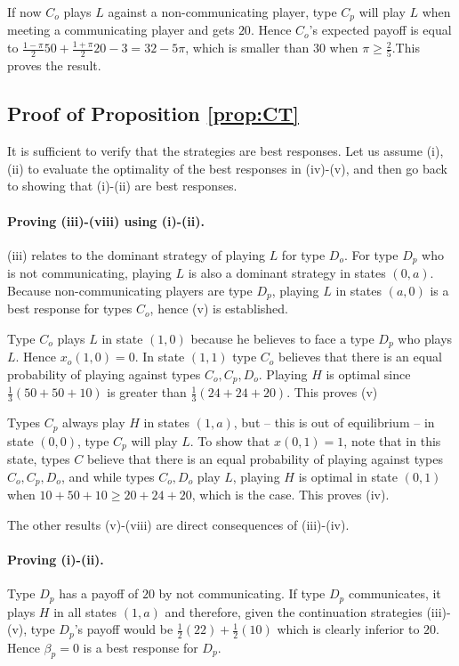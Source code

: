 \documentclass[12pt]{article}
\theoremstyle{break}
\begin{document}
	If now $C_o$ plays $L$ against a non-communicating player, type $C_p$ will play $L$ when meeting a communicating player and gets $20$.  Hence $C_o$'s expected payoff is equal to $\frac{1-\pi}{2}50+\frac{1+\pi}{2}20-3=32-5\pi$, which is smaller than $30$ when $\pi\geq \frac{2}{5}$.This proves the result.


\subsection*{Proof of Proposition \ref{prop:CT}}

It is sufficient to verify that the strategies are best responses. Let us assume (i), (ii) to evaluate the optimality of the best responses in (iv)-(v), and then go back to showing that (i)-(ii) are best responses.

\paragraph{Proving (iii)-(viii) using (i)-(ii).} (iii) relates to the dominant strategy of playing $L$ for type $D_o$. For type $D_p$ who is not communicating, playing $L$ is also a dominant strategy in states $(0,a)$. Because non-communicating players are type $D_p$, playing $L$ in states $(a,0)$ is a best response for types $C_o$, hence (v) is established. 

Type $C_o$ plays $L$ in state $(1,0)$ because he believes to face a type $D_p$ who plays $L$. Hence $x_o(1,0)=0$. In state $(1,1)$ type $C_o$ believes that there is an equal probability of playing against types $C_o,C_p,D_o$. Playing $H$ is optimal since $\frac{1}{3}(50+50+10)$ is greater than $\frac{1}{3}(24+24+20)$. This proves (v)

Types $C_p$ always play $H$ in states $(1,a)$, but -- this is out of equilibrium -- in state $(0,0)$, type $C_p$ will play $L$. To show that $x(0,1)=1$, note that in this state, types $C$ believe that  there is an equal probability of playing against types $C_o,C_p,D_o$, and while types $C_o,D_o$ play $L$, playing $H$ is optimal in state $(0,1)$ when $10+50+10\geq 20+24+20$, which is the case. This proves (iv).

The other results (v)-(viii) are direct consequences of (iii)-(iv).

\paragraph{Proving (i)-(ii).} Type $D_p$ has a payoff of $20$ by not communicating. If type $D_p$ communicates, it plays $H$ in all states $(1,a)$ and therefore, given the continuation strategies (iii)-(v), type $D_p$'s payoff would be $\frac{1}{2}(22)+\frac{1}{2}(10)$ which is clearly inferior to $20$. Hence $\beta_p=0$ is a best response for $D_p$.
\end{document}
